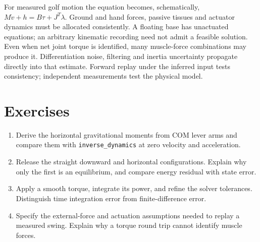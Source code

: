 For measured golf motion the equation becomes, schematically,
$M\dot v+h=B\tau+J^T\lambda$. Ground and hand forces, passive tissues and actuator
dynamics must be allocated consistently. A floating base has unactuated
equations; an arbitrary kinematic recording need not admit a feasible solution.
Even when net joint torque is identified, many muscle-force combinations may
produce it. Differentiation noise, filtering and inertia uncertainty propagate
directly into that estimate. Forward replay under the inferred input tests
consistency; independent measurements test the physical model.

\section*{Exercises}
\begin{enumerate}
 \item Derive the horizontal gravitational moments from COM lever arms and
 compare them with \texttt{inverse\_dynamics} at zero velocity and acceleration.
 \item Release the straight downward and horizontal configurations. Explain why
 only the first is an equilibrium, and compare energy residual with state error.
 \item Apply a smooth torque, integrate its power, and refine the solver
 tolerances. Distinguish time integration error from finite-difference error.
 \item Specify the external-force and actuation assumptions needed to replay a
 measured swing. Explain why a torque round trip cannot identify muscle forces.
\end{enumerate}
